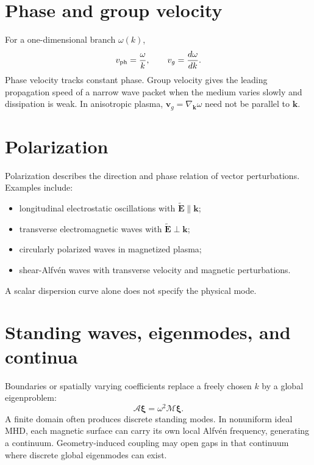 \documentclass[11pt]{article}
\begin{document}
\section{Phase and group velocity}

For a one-dimensional branch $\omega(k)$,
\begin{equation}
v_{\rm ph}=\frac{\omega}{k},\qquad
v_g=\frac{d\omega}{dk}.
\end{equation}
Phase velocity tracks constant phase. Group velocity gives the leading propagation speed of a narrow wave packet when the medium varies slowly and dissipation is weak. In anisotropic plasma, $\mathbf v_g=\nabla_{\mathbf k}\omega$ need not be parallel to $\mathbf k$.


\section{Polarization}

Polarization describes the direction and phase relation of vector perturbations. Examples include:
\begin{itemize}[leftmargin=1.6em]
\item longitudinal electrostatic oscillations with $\tilde{\mathbf E}\parallel\mathbf k$;
\item transverse electromagnetic waves with $\tilde{\mathbf E}\perp\mathbf k$;
\item circularly polarized waves in magnetized plasma;
\item shear-Alfvén waves with transverse velocity and magnetic perturbations.
\end{itemize}
A scalar dispersion curve alone does not specify the physical mode.


\section{Standing waves, eigenmodes, and continua}

Boundaries or spatially varying coefficients replace a freely chosen $k$ by a global eigenproblem:
\begin{equation}
\mathcal A\boldsymbol\xi=\omega^2\mathcal M\boldsymbol\xi.
\end{equation}
A finite domain often produces discrete standing modes. In nonuniform ideal MHD, each magnetic surface can carry its own local Alfvén frequency, generating a continuum. Geometry-induced coupling may open gaps in that continuum where discrete global eigenmodes can exist.
\end{document}
